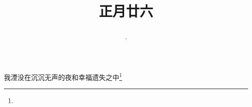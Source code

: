 \title{\date[d=6,m=3,y=2024][year:cn-y,年,month:cn,day:cn,日,·,weekday]·正月廿六 }
我湮没在沉沉无声的夜和幸福遗失之中\footnote{ }

